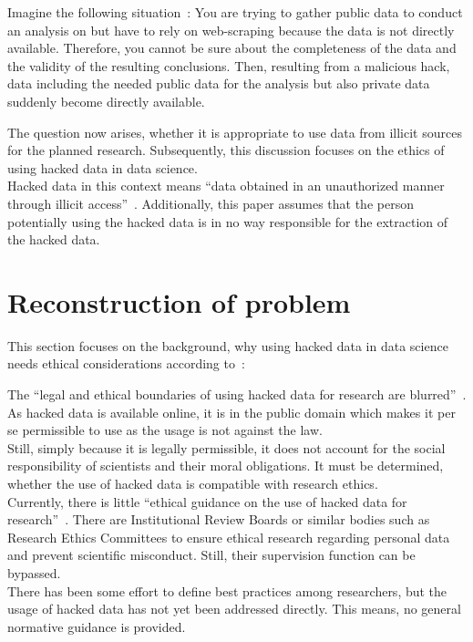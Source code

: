
Imagine the following situation~\parencite[][1-2]{patreon}:
You are trying to gather public data to conduct an analysis on but have to rely on web-scraping because the data is not directly available.
Therefore, you cannot be sure about the completeness of the data and the validity of the resulting conclusions.
Then, resulting from a malicious hack, data including the needed public data for the analysis but also private data suddenly become directly available.

The question now arises, whether it is appropriate to use data from illicit sources for the planned research.
Subsequently, this discussion focuses on the ethics of using hacked data in data science.\\
Hacked data in this context means ``data obtained in an unauthorized manner through illicit access''~\parencite[][744]{nature}.
Additionally, this paper assumes that the person potentially using the hacked data is in no way responsible for the extraction of the hacked data.

\section*{Reconstruction of problem}

This section focuses on the background, why using hacked data in data science needs ethical considerations according to~\textcite[][745]{nature}:

The ``legal and ethical boundaries of using hacked data for research are blurred''~\parencite[][745]{nature}.
As hacked data is available online, it is in the public domain which makes it per se permissible to use as the usage is not against the law.\\
Still, simply because it is legally permissible, it does not account for the social responsibility of scientists and their moral obligations.
It must be determined, whether the use of hacked data is compatible with research ethics.\\
Currently, there is little ``ethical guidance on the use of hacked data for research''~\parencite[][745]{nature}.
There are Institutional Review Boards or similar bodies such as Research Ethics Committees to ensure ethical research regarding personal data and prevent scientific misconduct.
Still, their supervision function can be bypassed.\\
There has been some effort to define best practices among researchers, but the usage of hacked data has not yet been addressed directly.
This means, no general normative guidance is provided.

